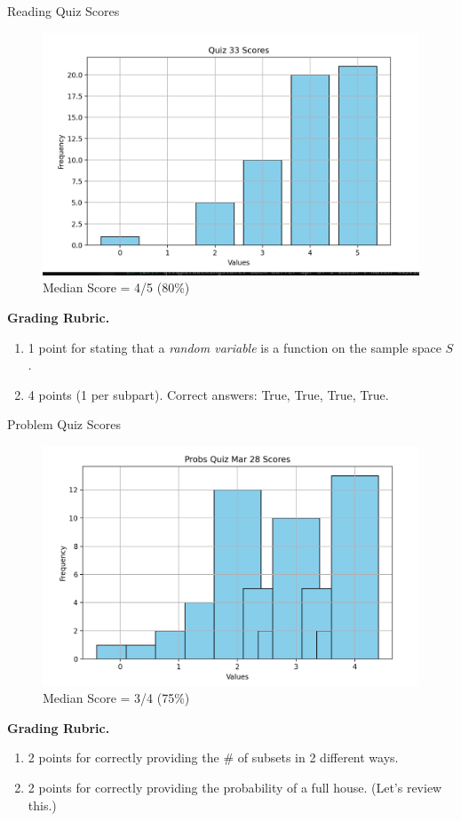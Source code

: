 \documentclass[10pt]{beamer}
\begin{document}
\begin{frame}{Reading Quiz Scores}
\footnotesize 
\begin{figure}[ht]
        \centering
        \includegraphics[width=.8\textwidth]{images/reading_quiz_scores}
   		 \caption{Median Score = 4/5 (80\%)}
\end{figure}
\vfill 
\textbf{Grading Rubric.}  	
\begin{enumerate}
\item 1 point for stating that a \textit{random variable} is a function on the sample space $S$. 
\item 4 points (1 per subpart). Correct answers: True, True, True, True.
\end{enumerate}

\end{frame}	

\begin{frame}{Problem Quiz Scores}
\footnotesize 
\begin{figure}[ht]
        \centering
        \includegraphics[width=.8\textwidth]{images/problems_quiz_scores}
   		 \caption{Median Score = 3/4 (75\%)}
\end{figure}
\vfill 
\textbf{Grading Rubric.}  
\begin{enumerate}
\item 2 points for correctly providing the \# of subsets in 2 different ways.
\item 2 points for correctly providing the probability of a full house. (\alert{Let's review this.}) 
\end{enumerate} 
\end{frame}	
\end{document}
